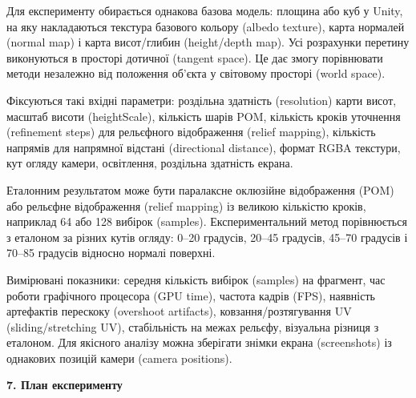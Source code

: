 \documentclass[14pt,a4paper]{extarticle}
\newcommand{\eng}[1]{\foreignlanguage{english}{#1}}
\newcommand{\sectiontitle}[1]{%
  \par\vspace{\baselineskip}%
  \noindent\textbf{#1}\par
}
\begin{document}
Для експерименту обирається однакова базова модель: площина або куб у Unity, на яку накладаються текстура базового кольору (\eng{albedo texture}), карта нормалей (\eng{normal map}) і карта висот/глибин (\eng{height/depth map}). Усі розрахунки перетину виконуються в просторі дотичної (\eng{tangent space}). Це дає змогу порівнювати методи незалежно від положення об'єкта у світовому просторі (\eng{world space}).

Фіксуються такі вхідні параметри: роздільна здатність (\eng{resolution}) карти висот, масштаб висоти (\eng{heightScale}), кількість шарів POM, кількість кроків уточнення (\eng{refinement steps}) для рельєфного відображення (\eng{relief mapping}), кількість напрямів для напрямної відстані (\eng{directional distance}), формат RGBA текстури, кут огляду камери, освітлення, роздільна здатність екрана.

Еталонним результатом може бути паралаксне оклюзійне відображення (POM) або рельєфне відображення (\eng{relief mapping}) із великою кількістю кроків, наприклад 64 або 128 вибірок (\eng{samples}). Експериментальний метод порівнюється з еталоном за різних кутів огляду: 0--20 градусів, 20--45 градусів, 45--70 градусів і 70--85 градусів відносно нормалі поверхні.

Вимірювані показники: середня кількість вибірок (\eng{samples}) на фрагмент, час роботи графічного процесора (\eng{GPU time}), частота кадрів (FPS), наявність артефактів перескоку (\eng{overshoot artifacts}), ковзання/розтягування UV (\eng{sliding/stretching UV}), стабільність на межах рельєфу, візуальна різниця з еталоном. Для якісного аналізу можна зберігати знімки екрана (\eng{screenshots}) із однакових позицій камери (\eng{camera positions}).

\sectiontitle{7. План експерименту}
\end{document}

